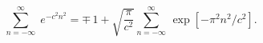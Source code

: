 \begin{equation}
\sum_{n=-\infty}^\infty\;e^{-c^2n^2}=\mp\,1+
\sqrt{\frac{\pi}{c^2}}\sum_{n=-\infty}^\infty\,\exp[-\pi^2n^2/c^2].
\label{sum}
\end{equation}

